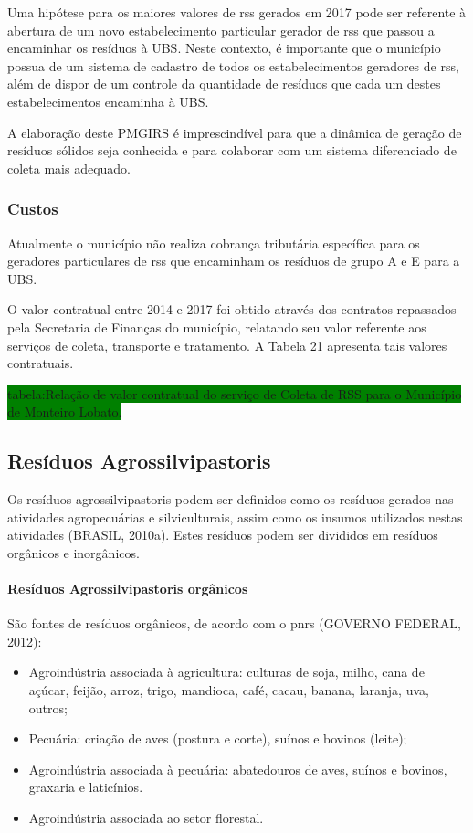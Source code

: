 	Uma hipótese para os maiores valores de \gls{rss} gerados em 2017 pode ser referente à abertura de um novo estabelecimento particular gerador de \gls{rss} que passou a encaminhar os resíduos à UBS. Neste contexto, é importante que o município possua de um sistema de cadastro de todos os estabelecimentos geradores de \gls{rss}, além de dispor de um controle da quantidade de resíduos que cada um destes estabelecimentos encaminha à UBS. 
	
	A elaboração deste PMGIRS é imprescindível para que a dinâmica de geração de resíduos sólidos seja conhecida e para colaborar com um sistema diferenciado de coleta mais adequado.
	
	\subsubsection{Custos}
	Atualmente o município não realiza cobrança tributária específica para os geradores particulares de \gls{rss} que encaminham os resíduos de grupo A e E para a UBS.

	O valor contratual entre 2014 e 2017 foi obtido através dos contratos repassados pela Secretaria de Finanças do município, relatando seu valor referente aos serviços de coleta, transporte e tratamento. A Tabela 21 apresenta tais valores contratuais.
	
	\colorbox{green}{tabela:Relação de valor contratual do serviço de Coleta de RSS para o Município de Monteiro Lobato.}
	
	\subsection{Resíduos Agrossilvipastoris}
	Os resíduos agrossilvipastoris podem ser definidos como os resíduos gerados nas atividades agropecuárias e silviculturais, assim como os insumos utilizados nestas atividades (BRASIL, 2010a). Estes resíduos podem ser divididos em resíduos orgânicos e inorgânicos.
	
	\paragraph{\textbf{Resíduos Agrossilvipastoris orgânicos}}
	São fontes de resíduos orgânicos, de acordo com o \gls{pnrs} (GOVERNO FEDERAL, 2012):
	
	\begin{itemize}
		\item Agroindústria associada à agricultura: culturas de soja, milho, cana de açúcar, feijão, arroz, trigo, mandioca, café, cacau, banana, laranja, uva, outros;
		\item Pecuária: criação de aves (postura e corte), suínos e bovinos (leite);
		\item Agroindústria associada à pecuária: abatedouros de aves, suínos e bovinos, graxaria e laticínios.
		\item Agroindústria associada ao setor florestal.
	\end{itemize}
	
